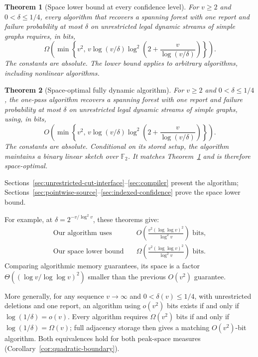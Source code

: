 \documentclass[11pt,letterpaper]{article}
\newtheorem{theorem}{Theorem}[section]
\numberwithin{equation}{section}
\begin{document}
\begin{samepage}
\begin{theorem}[Space lower bound at every confidence level]
\label{thm:unrestricted-space-lower}
For $v\ge2$ and $0<\delta\le1/4$, every algorithm that recovers a spanning forest with one report and failure probability at most $\delta$ on unrestricted legal dynamic streams of simple graphs requires, in bits,
\[
\Omega\!\left(\min\left\{v^2,\,
 v\log(v/\delta)\log^2\!\left(2+\frac{v}{\log(v/\delta)}\right)\right\}\right).
\]
The constants are absolute. The lower bound applies to arbitrary algorithms, including nonlinear algorithms.
\end{theorem}
\end{samepage}

\begin{theorem}[Space-optimal fully dynamic algorithm]
\label{thm:unrestricted-space}
For $v\ge2$ and $0<\delta\le1/4$, the one-pass algorithm recovers a spanning forest with one report and failure probability at most $\delta$ on unrestricted legal dynamic streams of simple graphs, using, in bits,
\begin{equation}
O\!\left(\min\left\{v^2,\,
 v\log(v/\delta)\log^2\!\left(2+\frac{v}{\log(v/\delta)}\right)\right\}\right).
\label{eq:graph-linear-main}
\end{equation}
The constants are absolute. Conditional on its stored setup, the algorithm maintains a binary linear sketch over $\mathbb F_2$. It matches Theorem~\ref{thm:unrestricted-space-lower} and is therefore space-optimal.
\end{theorem}

Sections~\ref{sec:unrestricted-cut-interface}--\ref{sec:compiler} present the algorithm; Sections~\ref{sec:pointwise-source}--\ref{sec:indexed-confidence} prove the space lower bound.

For example, at $\delta=2^{-v/\log^2v}$, these theorems give:
\[
\begin{aligned}
\text{Our algorithm uses}\quad
 &O\!\left(\frac{v^2(\log\log v)^2}{\log^2v}\right)\text{ bits},\\
\text{Our space lower bound}\quad
 &\Omega\!\left(\frac{v^2(\log\log v)^2}{\log^2v}\right)\text{ bits}.
\end{aligned}
\]
Comparing algorithmic memory guarantees, its space is a factor $\Theta((\log v/\log\log v)^2)$ smaller than the previous $O(v^2)$ guarantee.

More generally, for any sequence $v\to\infty$ and $0<\delta(v)\le1/4$, with unrestricted deletions and one report, an algorithm using $o(v^2)$ bits exists if and only if $\log(1/\delta)=o(v)$.
Every algorithm requires $\Omega(v^2)$ bits if and only if $\log(1/\delta)=\Omega(v)$; full adjacency storage then gives a matching $O(v^2)$-bit algorithm.
Both equivalences hold for both peak-space measures (Corollary~\ref{cor:quadratic-boundary}).
\end{document}
